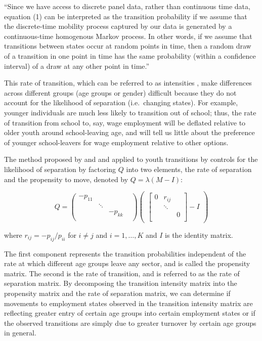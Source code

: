 \documentclass[
  a4paper, twoside, 12pt]{book}
\begin{document}
``Since we have access to discrete panel data, rather than continuous time data, equation (1) can be interpreted as the transition probability if we assume that the discrete-time mobility process captured by our data is generated by a continuous-time homogenous Markov process. In other words, if we assume that transitions between states occur at random points in time, then a random draw of a transition in one point in time has the same probability (within a confidence interval) of a draw at any other point in time.''

This rate of transition, which can be referred to as intensities \autocite{bosch2007}, make differences across different groups (age groups or gender) difficult because they do not account for the likelihood of separation (i.e.~changing states). For example, younger individuals are much less likely to transition out of school; thus, the rate of transition from school to, say, wage employment will be deflated relative to older youth around school-leaving age, and will tell us little about the preference of younger school-leavers for wage employment relative to other options.

The method proposed by \textcite{bosch2007} and \textcite{bosch2010} and applied to youth transitions by \textcite{cunningham2011} controls for the likelihood of separation by
factoring \(Q\) into two elements, the rate of separation and the propensity to move, denoted by \(Q = \lambda(M-I)\):

\begin{singlespacing}
$$
Q= \begin{pmatrix}
-p_{11} &  &  &  \\
 & \ddots &  &  \\
 &   & -p_{kk} & \\
\end{pmatrix}
\begin{pmatrix} \begin{bmatrix}
0 &  r_{ij} & \\
 & \ddots &  \\
 &  & 0  \\
\end{bmatrix} - I
\end{pmatrix}
$$
\end{singlespacing}

where \(r_{ij} = -p_{ij}/p_{ii}\) for \(i \neq j\) and \(i = 1, \dots, K\) and \(I\) is the identity matrix.

The first component represents the transition probabilities independent of the rate at which different age groups leave any sector, and is called the propensity matrix. The second is the rate of transition, and is referred to as the rate of separation matrix. By decomposing the transition intensity matrix into the propensity matrix and the rate of separation matrix, we can determine if movements to employment states observed in the transition intensity matrix are reflecting greater entry of certain age groups into certain employment states or if the observed transitions are simply due to greater turnover by certain age groups in general.
\end{document}
